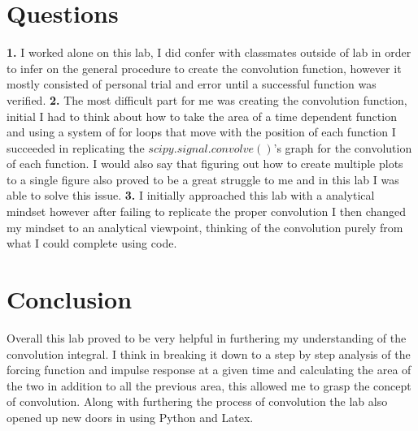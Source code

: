\documentclass[12pt]{report}
\begin{document}
\section{Questions}
\textbf{1.} I worked alone on this lab, I did confer with classmates outside of lab in order to infer on the general procedure to create the convolution function, however it mostly consisted of personal trial and error until a successful function was verified. \newline
\newline
\textbf{2.} The most difficult part for me was creating the convolution function, initial I had to think about how to take the area of a time dependent function and using a system of for loops that move with the position of each function I succeeded in replicating the $scipy.signal.convolve()$'s graph for the convolution of each function. I would also say that figuring out how to create multiple plots to a single figure also proved to be a great struggle to me and in this lab I was able to solve this issue.\newline
\newline
\textbf{3.} I initially approached this lab with a analytical mindset however after failing to replicate the proper convolution I then changed my mindset to an analytical viewpoint, thinking of the convolution purely from what I could complete using code. 

\section{Conclusion}
Overall this lab proved to be very helpful in furthering my understanding of the convolution integral. I think in breaking it down to a step by step analysis of the forcing function and impulse response at a given time and calculating the area of the two in addition to all the previous area, this allowed me to grasp the concept of convolution. Along with furthering the process of convolution the lab also opened up new doors in using Python and Latex. 


\newpage
\end{document}
